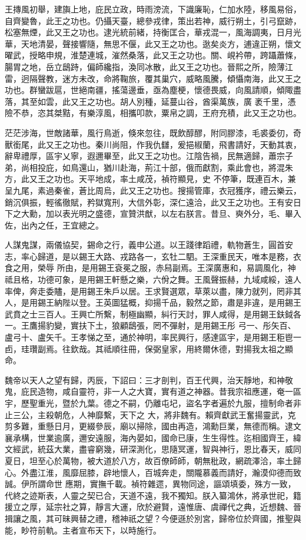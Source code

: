 \begin{pinyinscope}
 王摶風初舉，建旟上地，庇民立政，時雨滂流，下識廉恥，仁加水陸，移風易俗，自齊變魯，此王之功也。仍攝天臺，總參戎律，策出若神，威行朔土，引弓竄跡，松塞無煙，此又王之功也。逮光統前緒，持衡匡合，華戎混一，風海調夷，日月光
 華，天地清晏，聲接響隨，無思不偃，此又王之功也。逖矣炎方，逋違正朔，懷文曜武，授略申規，淮楚連城，漼然桑落，此又王之功也。關、峴衿帶，跨躡蕭條，腸胃之地，岳立鴟跱，偏師纔指，渙同冰散，此又王之功也。晉熙之所，險薄江雷，迥隔聲教，迷方未改，命將鞠旅，覆其巢穴，威略風騰，傾懾南海，此又王之功也。群蠻跋扈，世絕南疆，搖蕩邊垂，亟為塵梗，懷德畏威，向風請順，傾陬盡落，其至如雲，此又王之功也。胡人別種，延蔓山谷，酋渠萬族，廣
 袤千里，憑險不恭，恣其桀黠，有樂淳風，相攜叩款，粟帛之調，王府充積，此又王之功也。



 茫茫涉海，世敵諸華，風行鳥逝，倏來忽往，既飲醇醪，附同膠漆，毛裘委仞，奇獸銜尾，此又王之功也。秦川尚阻，作我仇讎，爰挹椒蘭，飛書請好，天動其衷，辭卑禮厚，區宇乂寧，遐邇畢至，此又王之功也。江陰告禍，民無適歸，蕭宗子弟，尚相投庇，如鳥還山，猶川赴海，荊江十部，俄而獻割，乘此會也，將混朱方，此又王之功也。天平地成，率土咸茂，禎符顯見，史
 不停筆，既連百木，兼呈九尾，素過秦雀，蒼比周烏，此又王之功也。搜揚管庫，衣冠獲序，禮云樂云，銷沉俱振，輕徭徹賦，矜獄寬刑，大信外彰，深仁遠洽，此又王之功也。王有安日下之大勳，加以表光明之盛德，宣贊洪猷，以左右朕言。昔旦、奭外分，毛、畢入佐，出內之任，王宜總之。



 人謀鬼謀，兩儀協契，錫命之行，義申公道。以王踐律蹈禮，軌物蒼生，圓首安志，率心歸道，是以錫王大路、戎路各一，玄牡二駟。王深重民天，唯本是務，衣食之用，榮辱
 所由，是用錫王袞冕之服，赤舄副焉。王深廣惠和，易調風化，神祗且格，功德可象，是用錫王軒懸之樂，六佾之舞。王風聲振赫，九域咸綏，遠人率俾，奔走委贐，是用錫王朱戶以居。王求賢選眾，草萊以盡，陳力就列，罔非其人，是用錫王納陛以登。王英圖猛概，抑揚千品，毅然之節，肅是非違，是用錫王武賁之士三百人。王興亡所繫，制極幽顯，糾行天討，罪人咸得，是用錫王鈇鉞各一。王鷹揚豹變，實扶下土，狼顧鴟張，罔不彈射，是用錫王彤
 弓一、彤矢百、盧弓十、盧矢千。王孝悌之至，通於神明，率民興行，感達區宇，是用錫王秬鬯一卣，珪瓚副焉。往欽哉。其祗順往冊，保弼皇家，用終爾休德，對揚我太祖之顯命。



 魏帝以天人之望有歸，丙辰，下詔曰：三才剖判，百王代興，治天靜地，和神敬鬼，庇民造物，咸自靈符，非一人之大寶，實有道之神器。昔我宗祖應運，奄一區宇，歷聖重光，暨於九葉。德之不嗣，仍離屯圮，盜名字者遍於九服，擅制命者非止三公，主殺朝危，人神靡繫，天下之
 大，將非魏有。賴齊獻武王奮揚靈武，克剪多難，重懸日月，更綴參辰，廟以掃除，國由再造，鴻勳巨業，無德而稱。逮文襄承構，世業逾廣，邇安遠服，海內晏如，國命已康，生生得性。迄相國齊王，緯文經武，統茲大業，盡睿窮幾，研深測化，思隨冥運，智與神行，恩比春天，威同夏日，坦至心於萬物，被大道於八方，故百僚師師，朝無秕政，網疏澤洽，率土歸心。外盡江淮，風靡屈膝，辟地懷人，百城奔走，關隴慕義而請好，瀚漠仰德而致誠。伊所謂命世
 應期，實撫千載。禎符雜遝，異物同途，謳頌填委，殊方一致，代終之迹斯表，人靈之契已合，天道不遠，我不獨知。朕入纂鴻休，將承世祀，籍援立之厚，延宗社之算，靜言大運，欣於避賢，遠惟唐、虞禪代之典，近想魏、晉揖讓之風，其可昧興替之禮，稽神祇之望？今便遜於別宮，歸帝位於齊國，推聖與能，眇符前軌。主者宣布天下，以時施行。




\end{pinyinscope}
